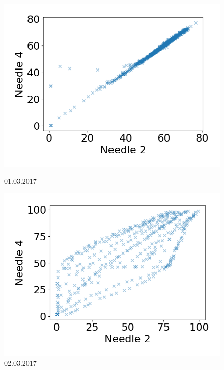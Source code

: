 \begin{figure}[h]
\begin{minipage}[b]{0.5\linewidth}
                \includegraphics[width = \textwidth]{report/figures/data/turb2_n2_n4_01032017.png}
                \caption{01.03.2017}
                \label{fig:n_pos_0103}
            \end{minipage}
            \begin{minipage}[b]{0.5\linewidth}
                \centering
                \includegraphics[width = \textwidth]{report/figures/data/turb2_n2_n4_02032017.png}
                \caption{02.03.2017}
                \label{fig:n_pos_0203}
            \end{minipage}
            \begin{minipage}[b]{0.5\linewidth}
                \centering

\end{minipage}
\end{figure}
